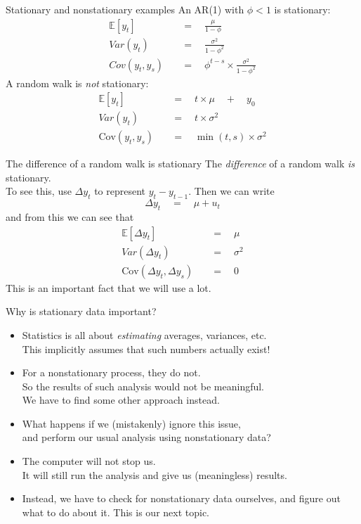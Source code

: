 \documentclass[t,12pt]{beamer}
\begin{document}
\begin{frame}{Stationary and nonstationary examples}
An AR(1) with $\phi<1$ is stationary:  
\begin{align*}
\mathbb{E}[y_t] \quad &= \quad \frac{\mu}{1-\phi}
\\
Var(y_t) \quad &= \quad \frac{\sigma^2}{1-\phi^2}
\\
Cov(y_t,y_s) \quad &= \quad \phi^{t-s} \times \frac{\sigma^2}{1-\phi^2}
\end{align*}
A random walk is \emph{not} stationary:
\begin{align*}
\mathbb{E}[y_t] \quad &= \quad t \times \mu \quad + \quad y_0
\\
Var(y_t) \quad &= \quad t \times \sigma^2
\\
\text{Cov}(y_t,y_s) \quad &= \quad \min(t,s) \times \sigma^2
\end{align*}
\end{frame}

\begin{frame}[c]{The difference of a random walk is stationary}
\label{difference_stationary}
The \emph{difference} of a random walk \emph{is} stationary.
\\ \medskip
To see this, use $\Delta y_t$ to represent $y_t - y_{t-1}$. Then we can write
$$
\Delta y_t \quad = \quad \mu + u_t
$$
and from this we can see that
\begin{align*}
\mathbb{E}[\Delta y_t] \quad &= \quad \mu
\\
Var(\Delta y_t) \quad &= \quad \sigma^2
\\
\text{Cov}(\Delta y_t, \Delta y_s) \quad &= \quad 0
\end{align*}
This is an important fact that we will use a lot.
\end{frame}

\begin{frame}[c]{Why is stationary data important?}
\begin{itemize}
\item Statistics is all about \emph{estimating} averages, variances, etc.
\\ This implicitly assumes that such numbers actually exist!
\medskip
\item For a nonstationary process, they do not.
\\ So the results of such analysis would not be meaningful.
\\ We have to find some other approach instead.
\medskip
\item 
What happens if we (mistakenly) ignore this issue,
\\ and perform our usual analysis using nonstationary data?
\medskip
\item The computer will not stop us.
\\ It will still run the analysis and give us (meaningless) results.
\medskip
\item Instead, we have to check for nonstationary data ourselves, and figure out what to do about it.
This is our next topic.
\end{itemize}
\end{frame}
\end{document}
